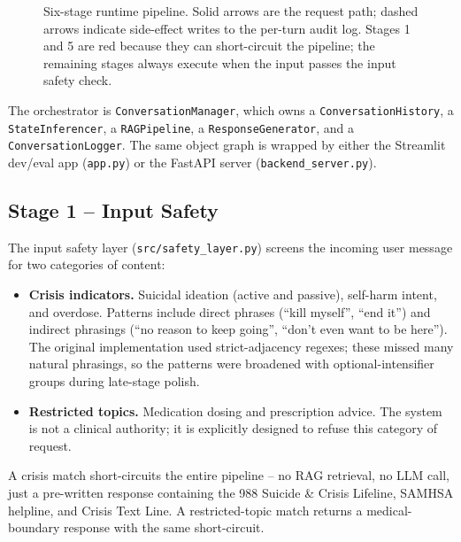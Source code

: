 \begin{figure}[t]
\begin{minipage}{0.95\linewidth}
\end{minipage}
\caption{Six-stage runtime pipeline. Solid arrows are the request path; dashed
arrows indicate side-effect writes to the per-turn audit log. Stages 1 and 5
are red because they can short-circuit the pipeline; the remaining stages
always execute when the input passes the input safety check.}
\label{fig:pipeline}
\end{figure}

The orchestrator is \texttt{ConversationManager}, which owns a
\texttt{ConversationHistory}, a \texttt{StateInferencer}, a
\texttt{RAGPipeline}, a \texttt{ResponseGenerator}, and a
\texttt{ConversationLogger}. The same object graph is wrapped by either the
Streamlit dev/eval app (\texttt{app.py}) or the FastAPI server
(\texttt{backend\_server.py}).

\subsection{Stage 1 -- Input Safety}

The input safety layer (\texttt{src/safety\_layer.py}) screens the incoming
user message for two categories of content:

\begin{itemize}
    \item \textbf{Crisis indicators.} Suicidal ideation (active and passive),
    self-harm intent, and overdose. Patterns include direct phrases
    (``kill myself'', ``end it'') and indirect phrasings (``no reason to
    keep going'', ``don't even want to be here''). The original implementation
    used strict-adjacency regexes; these missed many natural phrasings, so the
    patterns were broadened with optional-intensifier groups during late-stage
    polish.
    \item \textbf{Restricted topics.} Medication dosing and prescription
    advice. The system is not a clinical authority; it is explicitly designed
    to refuse this category of request.
\end{itemize}

A crisis match short-circuits the entire pipeline -- no RAG retrieval, no LLM
call, just a pre-written response containing the 988 Suicide \& Crisis
Lifeline, SAMHSA helpline, and Crisis Text Line. A restricted-topic match
returns a medical-boundary response with the same short-circuit.

